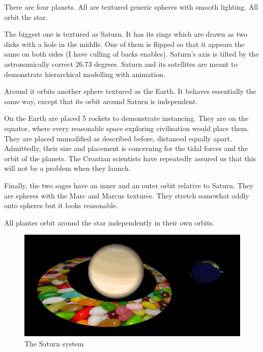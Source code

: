 \documentclass[10pt]{article}
\begin{document}
        There are four planets. All are textured generic spheres with smooth
        lighting. All orbit the star.

        The biggest one is textured as Saturn. It has its rings which are drawn
        as two disks with a hole in the middle. One of them is flipped so that
        it appears the same on both sides (I have culling of backs enables).
        Saturn's axis is tilted by the astronomically correct 26.73 degrees.
        Saturn and its satellites are meant to demonstrate hierarchical
        modelling with animation.

        Around it orbits another sphere textured as the Earth. It behaves
        essentially the same way, except that its orbit around Saturn is
        independent.

        On the Earth are placed 5 rockets to demonstrate instancing. They are
        on the equator, where every reasonable space exploring civilisation
        would place them. They are placed unmodified as described before,
        distanced equally apart. Admittedly, their size and placement is
        concerning for the tidal forces and the orbit of the planets. The
        Croatian scientists have repeatedly assured us that this will not be a
        problem when they launch.

        Finally, the two sages have an inner and an outer orbit relative to
        Saturn. They are spheres with the Marc and Marcus textures. They
        stretch somewhat oddly onto spheres but it looks reasonable.


        All plantes orbit around the star independently in their own orbits.


        \begin{figure}[h!]
            \caption{The Saturn system}
            \includegraphics[width=\textwidth]{saturn_system}
        \end{figure}
\end{document}
